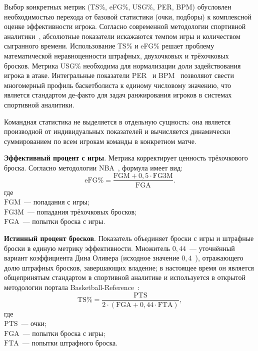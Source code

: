 Выбор конкретных метрик (TS\%, eFG\%, USG\%, PER, BPM) обусловлен
необходимостью перехода от базовой статистики (очки, подборы) к комплексной
оценке эффективности игрока. Согласно современной методологии спортивной
аналитики~\cite{kubatko}\cite{oliver}, абсолютные показатели искажаются
темпом игры и количеством сыгранного времени. Использование TS\% и eFG\%
решает проблему математической неравноценности штрафных, двухочковых
и трёхочковых бросков. Метрика USG\% необходима для нормализации доли
задействования игрока в атаке. Интегральные показатели PER~\cite{hollinger}
и BPM~\cite{bpm1} позволяют свести многомерный профиль баскетболиста
к единому числовому значению, что является стандартом де-факто для задач
ранжирования игроков в системах спортивной аналитики.

Командная статистика не выделяется в отдельную сущность: она является
производной от индивидуальных показателей и вычисляется динамически
суммированием по всем игрокам команды в конкретном матче.

\textbf{Эффективный процент с игры}. Метрика корректирует ценность
трёхочкового броска. Согласно методологии NBA~\cite{glossary-nba}, формула имеет вид:
\begin{equation}
\mathrm{eFG\%} = \frac{\mathrm{FGM} + 0{,}5 \cdot \mathrm{FG3M}}{\mathrm{FGA}}.
\end{equation}
\noindent где\\
$\mathrm{FGM}$~--- попадания с игры;\\
$\mathrm{FG3M}$~--- попадания трёхочковых бросков;\\
$\mathrm{FGA}$~--- попытки броска с игры.

\textbf{Истинный процент бросков}. Показатель объединяет броски с игры и
штрафные броски в единую метрику эффективности. Множитель $0{,}44$~--- уточнённый
вариант коэффициента Дина Оливера (исходное значение $0{,}4$~\cite{oliver}),
отражающего долю штрафных бросков, завершающих владение; в настоящее время он
является общепринятым стандартом в спортивной аналитике и используется в открытой
методологии портала Basketball-Reference~\cite{bref}:
\begin{equation}
\label{eq:ts}
\mathrm{TS\%} = \frac{\mathrm{PTS}}{2 \cdot (\mathrm{FGA} + 0{,}44 \cdot \mathrm{FTA})},
\end{equation}
\noindent где\\
$\mathrm{PTS}$~--- очки;\\
$\mathrm{FGA}$~--- попытки броска с игры;\\
$\mathrm{FTA}$~--- попытки штрафного броска.

